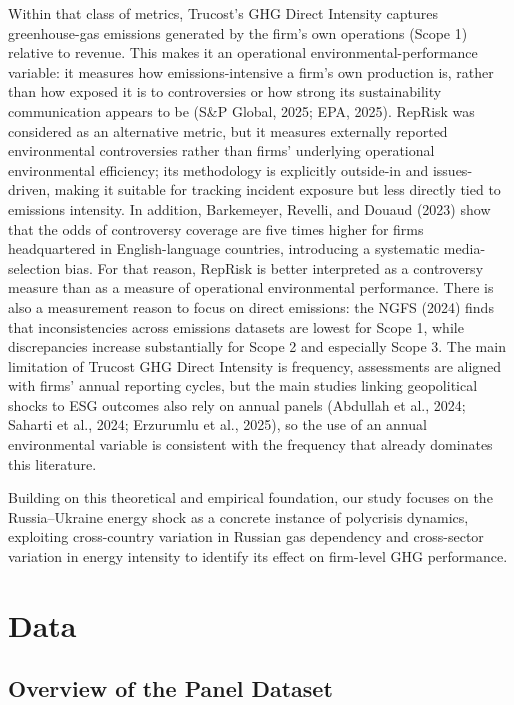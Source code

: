 \documentclass[12pt,a4paper]{article}
\begin{document}
Within that class of metrics, Trucost's GHG Direct Intensity captures greenhouse-gas emissions generated by the firm's own operations (Scope 1) relative to revenue. This makes it an operational environmental-performance variable: it measures how emissions-intensive a firm's own production is, rather than how exposed it is to controversies or how strong its sustainability communication appears to be (S\&P Global, 2025; EPA, 2025). RepRisk was considered as an alternative metric, but it measures externally reported environmental controversies rather than firms' underlying operational environmental efficiency; its methodology is explicitly outside-in and issues-driven, making it suitable for tracking incident exposure but less directly tied to emissions intensity. In addition, Barkemeyer, Revelli, and Douaud (2023) show that the odds of controversy coverage are five times higher for firms headquartered in English-language countries, introducing a systematic media-selection bias. For that reason, RepRisk is better interpreted as a controversy measure than as a measure of operational environmental performance. There is also a measurement reason to focus on direct emissions: the NGFS (2024) finds that inconsistencies across emissions datasets are lowest for Scope 1, while discrepancies increase substantially for Scope 2 and especially Scope 3. The main limitation of Trucost GHG Direct Intensity is frequency, assessments are aligned with firms' annual reporting cycles, but the main studies linking geopolitical shocks to ESG outcomes also rely on annual panels (Abdullah et al., 2024; Saharti et al., 2024; Erzurumlu et al., 2025), so the use of an annual environmental variable is consistent with the frequency that already dominates this literature.

Building on this theoretical and empirical foundation, our study focuses on the Russia--Ukraine energy shock as a concrete instance of polycrisis dynamics, exploiting cross-country variation in Russian gas dependency and cross-sector variation in energy intensity to identify its effect on firm-level GHG performance.


\section{Data}
\label{sec:data}

\subsection{Overview of the Panel Dataset}
\end{document}
